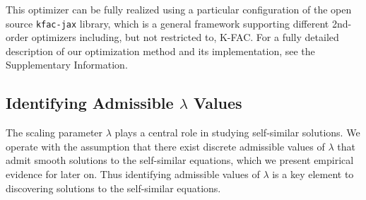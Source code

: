 \documentclass[fleqn,11pt]{wlscirep}
\begin{document}
This optimizer can be fully realized using a particular configuration of the open source \texttt{kfac-jax} library\cite{kfac-jax2022github}, which is a general framework supporting different 2nd-order optimizers including, but not restricted to, K-FAC. For a fully detailed description of our optimization method and its implementation, see the Supplementary Information.

\subsection*{Identifying Admissible $\lambda$ Values}
\label{methods:lambda}
The scaling parameter $\lambda$ plays a central role in studying self-similar solutions. We operate with the assumption that there exist discrete admissible values of $\lambda$ that admit smooth solutions to the self-similar equations, which we present empirical evidence for later on. Thus identifying admissible values of $\lambda$ is a key element to discovering solutions to the self-similar equations.
\end{document}
